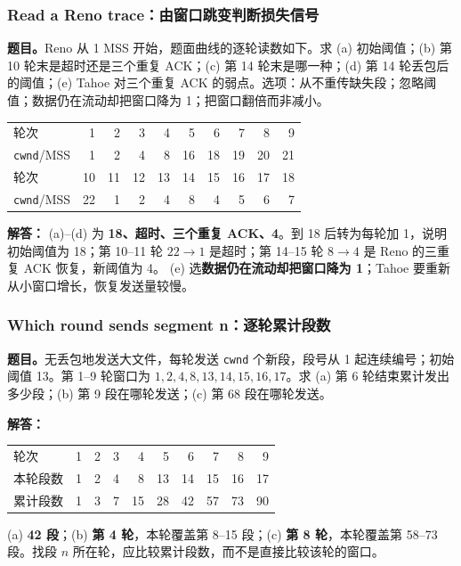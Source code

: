 \documentclass[11pt,a4paper,fontset=fandol]{ctexart}
\renewcommand{\exercisequestion}[2]{%
  \Needspace{5\baselineskip}%
  \subsubsection{#2}\label{exercise:#1}%
}
\renewenvironment{checkedsolution}
  {\par\nopagebreak[4]\textbf{解答：}\ignorespaces}
  {\par}
\begin{document}
\exercisequestion{SC2008-HW05-Q09}{Read a Reno trace：由窗口跳变判断损失信号}
\textbf{题目。}Reno 从 1 MSS 开始，题面曲线的逐轮读数如下。求 (a) 初始阈值；(b) 第 10 轮末是超时还是三个重复 ACK；(c) 第 14 轮末是哪一种；(d) 第 14 轮丢包后的阈值；(e) Tahoe 对三个重复 ACK 的弱点。选项：从不重传缺失段；忽略阈值；数据仍在流动却把窗口降为 1；把窗口翻倍而非减小。
\begin{center}
\small
\begin{tabular}{@{}lrrrrrrrrr@{}}
\toprule
轮次 & 1 & 2 & 3 & 4 & 5 & 6 & 7 & 8 & 9 \\
\texttt{cwnd}/MSS & 1 & 2 & 4 & 8 & 16 & 18 & 19 & 20 & 21 \\
\midrule
轮次 & 10 & 11 & 12 & 13 & 14 & 15 & 16 & 17 & 18 \\
\texttt{cwnd}/MSS & 22 & 1 & 2 & 4 & 8 & 4 & 5 & 6 & 7 \\
\bottomrule
\end{tabular}
\end{center}
\begin{checkedsolution}
(a)--(d) 为 \textbf{18、超时、三个重复 ACK、4}。到 18 后转为每轮加 1，说明初始阈值为 18；第 10--11 轮 $22\to1$ 是超时；第 14--15 轮 $8\to4$ 是 Reno 的三重复 ACK 恢复，新阈值为 4。
(e) 选\textbf{数据仍在流动却把窗口降为 1}；Tahoe 要重新从小窗口增长，恢复发送量较慢。
\end{checkedsolution}

\exercisequestion{SC2008-HW05-Q10}{Which round sends segment n：逐轮累计段数}
\textbf{题目。}无丢包地发送大文件，每轮发送 \texttt{cwnd} 个新段，段号从 1 起连续编号；初始阈值 13。第 1--9 轮窗口为 $1,2,4,8,13,14,15,16,17$。求 (a) 第 6 轮结束累计发出多少段；(b) 第 9 段在哪轮发送；(c) 第 68 段在哪轮发送。
\begin{checkedsolution}
\begin{center}
\small
\begin{tabular}{@{}lrrrrrrrrr@{}}
\toprule
轮次 & 1 & 2 & 3 & 4 & 5 & 6 & 7 & 8 & 9 \\
本轮段数 & 1 & 2 & 4 & 8 & 13 & 14 & 15 & 16 & 17 \\
累计段数 & 1 & 3 & 7 & 15 & 28 & 42 & 57 & 73 & 90 \\
\bottomrule
\end{tabular}
\end{center}
(a) \textbf{42 段}；(b) \textbf{第 4 轮}，本轮覆盖第 8--15 段；(c) \textbf{第 8 轮}，本轮覆盖第 58--73 段。找段 $n$ 所在轮，应比较累计段数，而不是直接比较该轮的窗口。
\end{checkedsolution}
\end{document}
